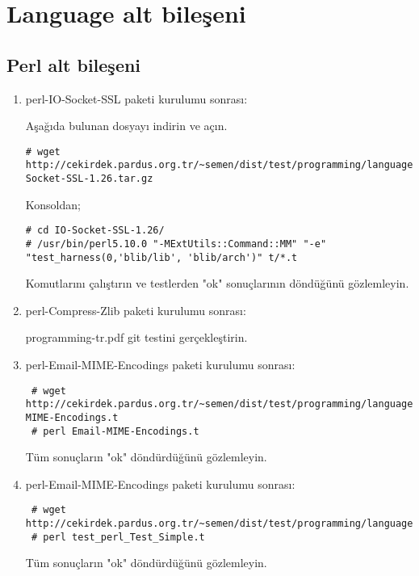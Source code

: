 \documentclass[a4paper,10pt]{article}
\begin{document}
\section{Language alt bileşeni}
\subsection{Perl alt bileşeni}
\begin{enumerate}
\item perl-IO-Socket-SSL paketi kurulumu sonrası:

Aşağıda bulunan dosyayı indirin ve açın.
\begin{verbatim}
# wget http://cekirdek.pardus.org.tr/~semen/dist/test/programming/language/perl/IO-Socket-SSL-1.26.tar.gz
\end{verbatim}

Konsoldan;
\begin{verbatim}
# cd IO-Socket-SSL-1.26/
# /usr/bin/perl5.10.0 "-MExtUtils::Command::MM" "-e" "test_harness(0,'blib/lib', 'blib/arch')" t/*.t
\end{verbatim}

Komutlarını çalıştırın ve testlerden "ok" sonuçlarının döndüğünü gözlemleyin.
\item perl-Compress-Zlib paketi kurulumu sonrası:

programming-tr.pdf git testini gerçekleştirin.

\item perl-Email-MIME-Encodings paketi kurulumu sonrası:
\begin{verbatim}
 # wget http://cekirdek.pardus.org.tr/~semen/dist/test/programming/language/perl/Email-MIME-Encodings.t
 # perl Email-MIME-Encodings.t
\end{verbatim}

Tüm sonuçların "ok" döndürdüğünü gözlemleyin. 

\item perl-Email-MIME-Encodings paketi kurulumu sonrası:
\begin{verbatim}
 # wget http://cekirdek.pardus.org.tr/~semen/dist/test/programming/language/perl/test_perl_Test_Simple.t
 # perl test_perl_Test_Simple.t
\end{verbatim}

Tüm sonuçların "ok" döndürdüğünü gözlemleyin. 


\end{enumerate}
\end{document}
